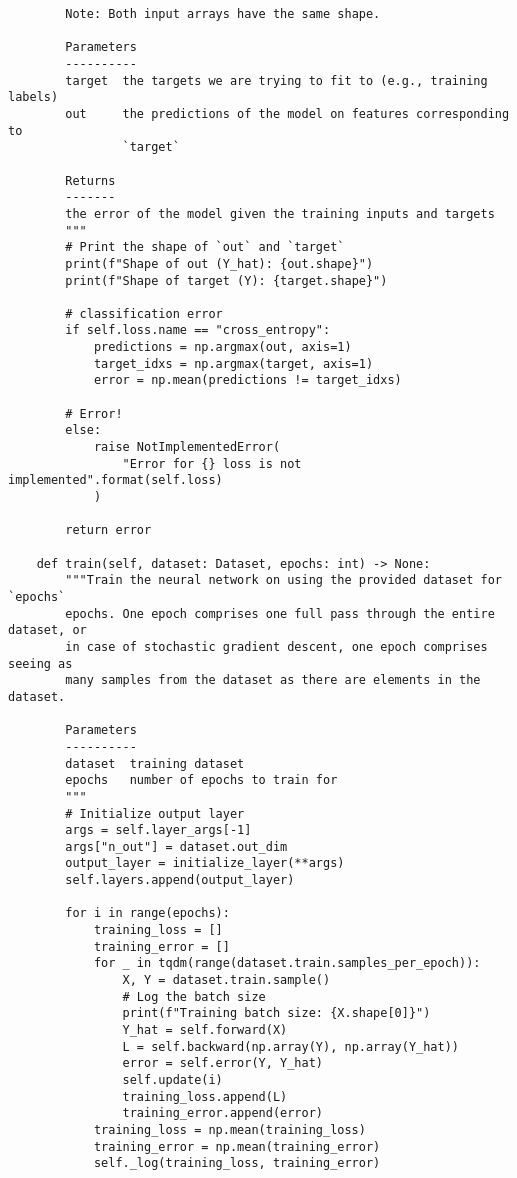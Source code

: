 \documentclass{article}
\begin{document}
\begin{enumerate}
\begin{verbatim}
        Note: Both input arrays have the same shape.

        Parameters
        ----------
        target  the targets we are trying to fit to (e.g., training labels)
        out     the predictions of the model on features corresponding to
                `target`

        Returns
        -------
        the error of the model given the training inputs and targets
        """
        # Print the shape of `out` and `target`
        print(f"Shape of out (Y_hat): {out.shape}")
        print(f"Shape of target (Y): {target.shape}")

        # classification error
        if self.loss.name == "cross_entropy":
            predictions = np.argmax(out, axis=1)
            target_idxs = np.argmax(target, axis=1)
            error = np.mean(predictions != target_idxs)

        # Error!
        else:
            raise NotImplementedError(
                "Error for {} loss is not implemented".format(self.loss)
            )

        return error

    def train(self, dataset: Dataset, epochs: int) -> None:
        """Train the neural network on using the provided dataset for `epochs`
        epochs. One epoch comprises one full pass through the entire dataset, or
        in case of stochastic gradient descent, one epoch comprises seeing as
        many samples from the dataset as there are elements in the dataset.

        Parameters
        ----------
        dataset  training dataset
        epochs   number of epochs to train for
        """
        # Initialize output layer
        args = self.layer_args[-1]
        args["n_out"] = dataset.out_dim
        output_layer = initialize_layer(**args)
        self.layers.append(output_layer)

        for i in range(epochs):
            training_loss = []
            training_error = []
            for _ in tqdm(range(dataset.train.samples_per_epoch)):
                X, Y = dataset.train.sample()
                # Log the batch size
                print(f"Training batch size: {X.shape[0]}")
                Y_hat = self.forward(X)
                L = self.backward(np.array(Y), np.array(Y_hat))
                error = self.error(Y, Y_hat)
                self.update(i)
                training_loss.append(L)
                training_error.append(error)
            training_loss = np.mean(training_loss)
            training_error = np.mean(training_error)
            self._log(training_loss, training_error)


\end{verbatim}
\end{enumerate}
\end{document}
